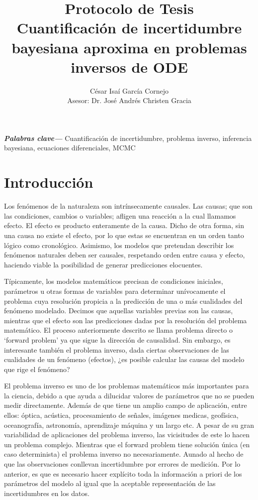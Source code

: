 \documentclass{article}
\title{\textbf{Protocolo de Tesis}\\Cuantificación de incertidumbre bayesiana aproxima en problemas inversos de ODE}
\author{César Isaí García Cornejo \\
Asesor: Dr. José Andrés Christen Gracia}
\providecommand{\keywords}[1]
{
  \small	
  \textbf{\textit{Palabras clave---}} #1
}
\begin{document}
\maketitle

\keywords{Cuantificación de incertidumbre, problema inverso, inferencia bayesiana, ecuaciones diferenciales, MCMC}

\section{Introducción}

Los fenómenos de la naturaleza son intrínsecamente causales. Las causas; que son las condiciones, cambios o variables; afligen una reacción a la cual llamamos efecto. El efecto es producto enteramente de la causa. Dicho de otra forma, sin una causa no existe el efecto, por lo que estas se encuentran en un orden tanto lógico como cronológico. Asimismo, los modelos que pretendan describir los fenómenos naturales deben ser causales, respetando orden entre causa y efecto, haciendo viable la posibilidad de generar predicciones elocuentes. 

Típicamente, los modelos matemáticos precisan de condiciones iniciales, parámetros u otras formas de variables para determinar unívocamente el problema cuya resolución propicia a la predicción de una o más cualidades del fenómeno modelado. Decimos que aquellas variables previas son las causas, mientras que el efecto son las predicciones dadas por la resolución del problema matemático.
El proceso anteriormente descrito se llama problema directo o `forward problem' ya que sigue la dirección de causalidad. Sin embargo, es interesante también el problema inverso, dada ciertas observaciones de las cualidades de un fenómeno (efectos), ¿es posible calcular las causas del modelo que rige el fenómeno?

El problema inverso es uno de los problemas matemáticos más importantes para la ciencia, debido a que ayuda a dilucidar valores de parámetros que no se pueden medir directamente. Además de que tiene un amplio campo de aplicación, entre ellos: óptica, acústica, procesamiento de señales, imágenes medicas, geofísica, oceanografía, astronomía, aprendizaje máquina y un largo etc. A pesar de su gran variabilidad de aplicaciones del problema inverso, las vicisitudes de este lo hacen un problema complejo. Mientras que el forward problem tiene solución única (en caso determinista) el problema inverso no necesariamente. Aunado al hecho de que las observaciones conllevan incertidumbre por errores de medición. Por lo anterior, es que es necesario hacer explícito toda la información a priori de los parámetros del modelo al igual que la aceptable representación de las incertidumbres en los datos.
\end{document}

